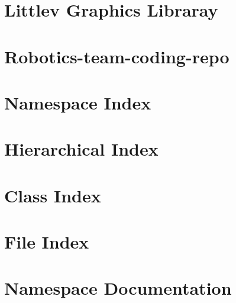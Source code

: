 \documentclass[twoside]{book}
\newcommand{\+}{\discretionary{\mbox{\scriptsize$\hookleftarrow$}}{}{}}
\begin{document}
\chapter{Littlev Graphics Libraray}
\label{md__pros_test_6_include_display__r_e_a_d_m_e}

\chapter{Robotics-\/team-\/coding-\/repo}
\label{md__r_e_a_d_m_e}

\chapter{Namespace Index}

\chapter{Hierarchical Index}

\chapter{Class Index}

\chapter{File Index}

\chapter{Namespace Documentation}

\end{document}
